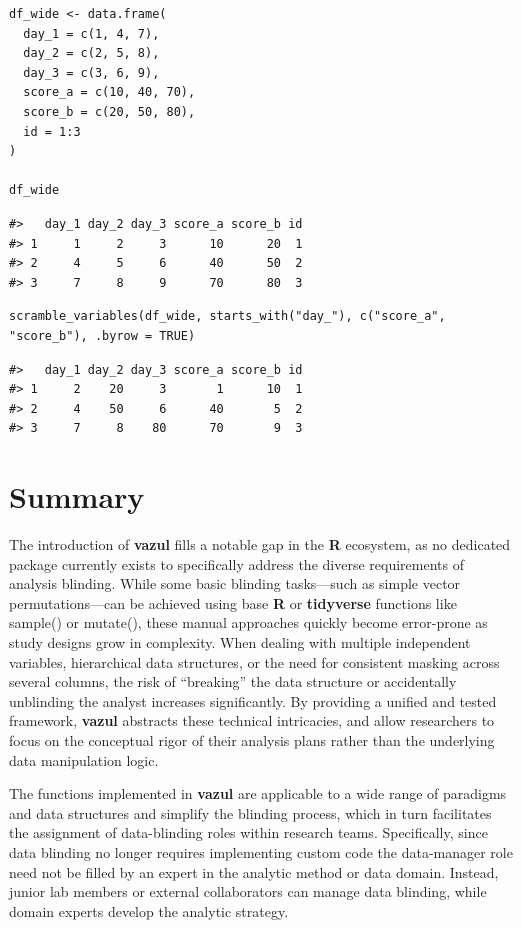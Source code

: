 \begin{verbatim}
df_wide <- data.frame(
  day_1 = c(1, 4, 7),
  day_2 = c(2, 5, 8),
  day_3 = c(3, 6, 9),
  score_a = c(10, 40, 70),
  score_b = c(20, 50, 80),
  id = 1:3
)

df_wide
\end{verbatim}

\begin{verbatim}
#>   day_1 day_2 day_3 score_a score_b id
#> 1     1     2     3      10      20  1
#> 2     4     5     6      40      50  2
#> 3     7     8     9      70      80  3
\end{verbatim}

\begin{verbatim}
scramble_variables(df_wide, starts_with("day_"), c("score_a", "score_b"), .byrow = TRUE)
\end{verbatim}

\begin{verbatim}
#>   day_1 day_2 day_3 score_a score_b id
#> 1     2    20     3       1      10  1
#> 2     4    50     6      40       5  2
#> 3     7     8    80      70       9  3
\end{verbatim}

\section{Summary}\label{summary}

The introduction of \textbf{vazul} fills a notable gap in the \textbf{R} ecosystem, as no dedicated package currently exists to specifically address the diverse requirements of analysis blinding. While some basic blinding tasks---such as simple vector permutations---can be achieved using base \textbf{R} or \textbf{tidyverse} functions like sample() or mutate(), these manual approaches quickly become error-prone as study designs grow in complexity. When dealing with multiple independent variables, hierarchical data structures, or the need for consistent masking across several columns, the risk of ``breaking'' the data structure or accidentally unblinding the analyst increases significantly. By providing a unified and tested framework, \textbf{vazul} abstracts these technical intricacies, and allow researchers to focus on the conceptual rigor of their analysis plans rather than the underlying data manipulation logic.

The functions implemented in \textbf{vazul} are applicable to a wide range of paradigms and data structures and simplify the blinding process, which in turn facilitates the assignment of data-blinding roles within research teams. Specifically, since data blinding no longer requires implementing custom code the data-manager role need not be filled by an expert in the analytic method or data domain. Instead, junior lab members or external collaborators can manage data blinding, while domain experts develop the analytic strategy.

